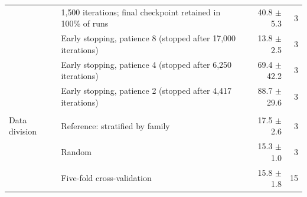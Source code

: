 \begin{tabular}{llrr}
 & 1{,}500 iterations; final checkpoint retained in 100\% of runs & 40.8 $\pm$ 5.3 & 3 \\
 & Early stopping, patience 8 (stopped after 17{,}000 iterations) & 13.8 $\pm$ 2.5 & 3 \\
 & Early stopping, patience 4 (stopped after 6{,}250 iterations) & 69.4 $\pm$ 42.2 & 3 \\
 & Early stopping, patience 2 (stopped after 4{,}417 iterations) & 88.7 $\pm$ 29.6 & 3 \\
\addlinespace \\
Data division & Reference: stratified by family & 17.5 $\pm$ 2.6 & 3 \\
 & Random & 15.3 $\pm$ 1.0 & 3 \\
 & Five-fold cross-validation & 15.8 $\pm$ 1.8 & 15 \\
\bottomrule
\end{tabular}
